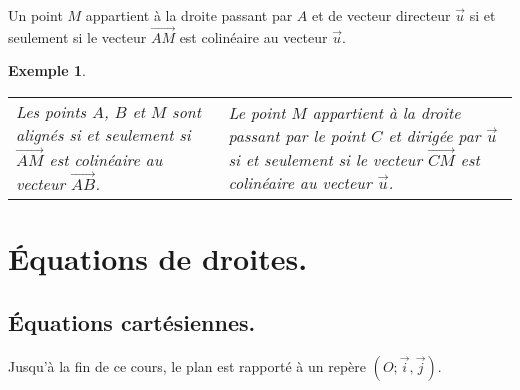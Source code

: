 \documentclass[a4paper,11pt]{article}
\theoremstyle{break}
\newcounter{enonce}
\newtheorem{exemple}[enonce]{Exemple}
\begin{document}
   \begin{proposition}
    Un point $M$ appartient à la droite passant par $A$ et de vecteur directeur $\vec{u}$
    si et seulement si le vecteur {$\vec{AM}$} est colinéaire au vecteur $\vec{u}$.
   \end{proposition}
   
   \begin{exemple}
  ~
  \begin{center}
  

   
\begin{tabular}{p{4.7cm}|p{4.7cm}}
Les points $A$, $B$ et $M$ sont alignés si et seulement si
{$\vec{AM}$} est colinéaire au vecteur $\vec{AB}$.
&
Le point $M$ appartient à la droite passant par le point $C$ et dirigée par $\vec{u}$
si et seulement si le vecteur {$\vec{CM}$} est colinéaire au vecteur {$\vec{u}$}.
\end{tabular}
\end{center}
  \end{exemple}
  
   \section{\'Equations de droites.}
   
   \subsection{\'Equations cartésiennes.}

    
    Jusqu'à la fin de ce cours, le plan est rapporté à un repère $(O;\vec{i},\vec{j})$.
    
\end{document}
